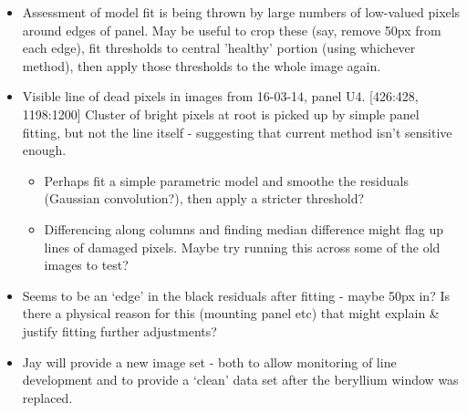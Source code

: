 \documentclass[10pt,fleqn]{article}
\begin{document}
\begin{itemize}
\item Assessment of model fit is being thrown by large numbers of low-valued pixels around edges of panel. May be useful to crop these (say, remove 50px from each edge), fit thresholds to central 'healthy' portion (using whichever method), then apply those thresholds to the whole image again.

\item Visible line of dead pixels in images from 16-03-14, panel U4. [426:428, 1198:1200] Cluster of bright pixels at root is picked up by simple panel fitting, but not the line itself - suggesting that current method isn't sensitive enough.
\begin{itemize}
	\item Perhaps fit a simple parametric model and smoothe the residuals (Gaussian convolution?), then apply a stricter threshold?
	\item Differencing along columns and finding median difference might flag up lines of damaged pixels. Maybe try running this across some of the old images to test?
\end{itemize}

\item Seems to be an `edge' in the black residuals after fitting - maybe 50px in? Is there a physical reason for this (mounting panel etc) that might explain \& justify fitting further adjustments?

\item Jay will provide a new image set - both to allow monitoring of line development and to provide a `clean' data set after the beryllium window was replaced.

\end{itemize}
\end{document}
